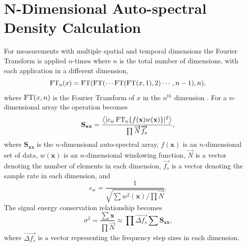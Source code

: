 \section{N-Dimensional Auto-spectral Density Calculation}
For measurements with multiple spatial and temporal dimensions the Fourier Transform is applied $n$-times where $n$ is the total number of dimensions, with each application in a different dimension,
\begin{equation}
 \operatorname{FT_n}(x) = \operatorname{FT}(\operatorname{FT}(\cdots\operatorname{FT}(\operatorname{FT}(x,1),2)\cdots,n-1),n) \textrm{,}
 \label{eqn:04_fftn}
\end{equation}
where $\operatorname{FT}(x,n)$ is the Fourier Transform of $x$ in the $n^{th}$ dimension \cite{An-1991-QKg7heKm}.
For a $n$-dimensional array the operation becomes \cite{McClellan-1982-rGQzuZ7t}
\begin{equation}
 \mathbf{S_{xx}} =\frac{\left<|c_w\fftn\{f(\mathbf{x}) w(\mathbf{x})\}|^2\right>}{\prod{\overrightarrow{N}\overrightarrow{f_s}}} \textrm{,}
 \label{eqn:04_sxxn}
\end{equation}
where $\mathbf{S_{xx}}$ is the $n$-dimensional auto-spectral array, $f(\mathbf{x})$ is an $n$-dimensional set of data, $w(\mathbf{x})$ is an $n$-dimensional windowing function, $\overrightarrow{N}$ is a vector denoting the number of elements in each dimension, $\overrightarrow{f_s}$ is a vector denoting the sample rate in each dimension, and
\begin{equation}
 c_w = \frac{1}{\sqrt{\sum w^2(\mathbf{x})/\prod{\overrightarrow{N}}}} \textrm{.}
 \label{eqn:04_windown}
\end{equation}
The signal energy conservation relationship becomes
\begin{equation}
  \sigma^2=\frac{\sum\mathbf{x}}{\prod{\overrightarrow{N}}} \approx \prod{\overrightarrow{\Delta f_s}}\sum\mathbf{S_{xx}} \textrm{,}
  \label{eqn:04_fftn_energy_conservation}
\end{equation}
where $\overrightarrow{\Delta f_s}$ is a vector representing the frequency step sizes in each dimension.

